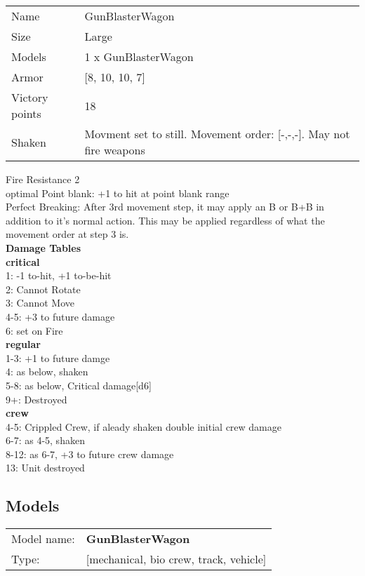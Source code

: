 \begin{tabular}{ll}
  Name & GunBlasterWagon \\
  Size & Large\\
  Models & 1 x GunBlasterWagon\\
  Armor & [8, 10, 10, 7]\\
  Victory points & 18\\
  Shaken & Movment set to still. Movement order: [-,-,-]. May not fire weapons\\
\end{tabular}

Fire Resistance 2\\ 
optimal Point blank: +1 to hit at point blank range\\ 
Perfect Breaking: After 3rd movement step, it may apply an B or B+B in addition to it's normal action. This may be applied regardless of what the movement order at step 3 is.\\ 



{\bf Damage Tables} \\
 {\bf critical } \\
1: -1 to-hit, +1 to-be-hit \\
2: Cannot Rotate \\
3: Cannot Move \\
4-5: +3 to future damage \\
6: set on Fire \\
 {\bf regular } \\
1-3: +1 to future damge \\
4: as below, shaken \\
5-8: as below, Critical damage[d6] \\
9+: Destroyed \\
 {\bf crew } \\
4-5: Crippled Crew, if aleady shaken double initial crew damage \\
6-7: as 4-5, shaken \\
8-12: as 6-7, +3 to future crew damage \\
13: Unit destroyed \\


\clearpage

\subsection{ Models }

\begin{tabular}{ll}
Model name: & {\bf GunBlasterWagon } \\
Type: & [mechanical, bio crew, track, vehicle] \\
\end{tabular}


